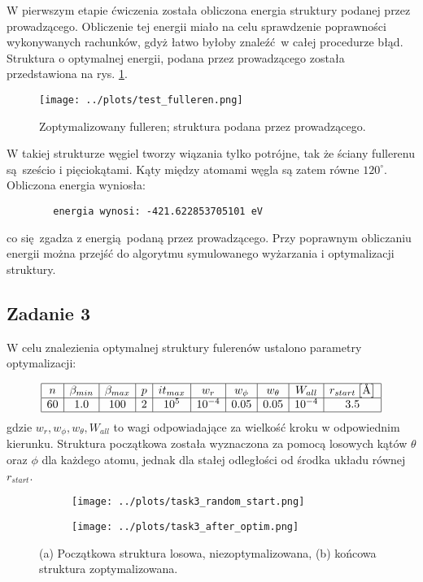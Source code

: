\documentclass[a4paper,12pt]{article}
\begin{document}
	W pierwszym etapie ćwiczenia została obliczona energia struktury podanej przez prowadzącego. 
	Obliczenie tej energii miało na celu sprawdzenie poprawności wykonywanych rachunków, gdyż łatwo byłoby znaleźć w całej procedurze błąd.
	Struktura o optymalnej energii, podana przez prowadzącego została przedstawiona na rys. \ref{test_fulleren}.
	\begin{figure}[h]
		\centering
		\texttt{[image: ../plots/test\_fulleren.png]}
		\caption{Zoptymalizowany fulleren; struktura podana przez prowadzącego.}
		\label{test_fulleren}
	\end{figure}
	W takiej strukturze węgiel tworzy wiązania tylko potrójne, tak że ściany fullerenu są sześcio i pięciokątami. 
	Kąty między atomami węgla są zatem równe $120^\circ$.
	Obliczona energia wyniosła:
	\begin{verbatim}
		energia wynosi: -421.622853705101 eV
	\end{verbatim}
	co się zgadza z energią podaną przez prowadzącego. 
	Przy poprawnym obliczaniu energii można przejść do algorytmu symulowanego wyżarzania i optymalizacji struktury.
	
	\subsection*{Zadanie 3}
	
	W celu znalezienia optymalnej struktury fulerenów ustalono parametry optymalizacji:
	
	\[
	\begin{array}{|c|c|c|c|c|c|c|c|c|c|}
		\hline
		n & \beta_{min} & \beta_{max} & p  & it_{max}  & w_r & w_\phi & w_\theta  & W_{all} & r_{start} \left[\text{\AA}\right] \\ \hline
		60 & 1.0 & 100 & 2 & 10^5 & 10^{-4} & 0.05 & 0.05 & 10^{-4} & 3.5 \\ \hline 
 	\end{array}
	\]
	gdzie $w_r, w_\phi, w_\theta, W_{all}$ to wagi odpowiadające za wielkość kroku w odpowiednim kierunku. Struktura początkowa została wyznaczona za pomocą losowych kątów $\theta$ oraz $\phi$ dla każdego atomu, jednak dla stałej odległości od środka układu równej $r_{start}$.
	\begin{figure}[H]
		\centering
		\begin{subfigure}{0.49\textwidth}
			\centering 
			\texttt{[image: ../plots/task3\_random\_start.png]}
			\caption{}
		\end{subfigure}
		\begin{subfigure}{0.49\textwidth}
			\centering 
			\texttt{[image: ../plots/task3\_after\_optim.png]}
			\caption{}
		\end{subfigure}
		\caption{(a) Początkowa struktura losowa, niezoptymalizowana, (b) końcowa struktura zoptymalizowana.}
	\end{figure}
	
\end{document}
